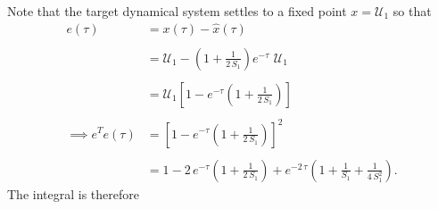 \begin{enumerate}
Note that the target dynamical system settles to a fixed point $x = \mathcal{U}_1$ so that
\begin{align*}
e(\tau) &= x(\tau) -
 \hat
 {
 	x
 }
 (
 	\tau
 )
%
\\
\\
%
&= 
\mathcal{U}_1 - 
\left(
	1 + 
	\frac
	{
		1
	}
	{
		2 \, S_1
	}
\right)
e^
{
	- \tau
}
\, \, \mathcal{U}_1
%
\\
\\
%
&= 
\mathcal{U}_1 
\left[
	1 - e^
	{
		-\tau
	}
	\left(
		1 + 
		\frac
		{
			1
		}
		{
			2 \, S_1
		}
	\right)
\right]
%
\\
\\
%
\implies
e^T e
\left(
\tau
\right)
&=
\left[
	1 - e^
	{
		-\tau
	}
	\left(
		1 + 
		\frac
		{
			1
		}
		{
			2 \, S_1
		}
	\right)
\right]^2
%
\\
\\
%
&= 
1 - 2 \, e^
{
	-\tau
}
\left(
	1 + 
	\frac
	{
		1
	}
	{
		2 \, S_1
	}
\right)
+
e^
{
	-2 \, \tau
}
\left(
	1 + 
	\frac
	{
		1
	}
	{
		S_1
	}
	+
	\frac
	{
		1
	}
	{
		4 \, S_1^2
	}
\right).
\end{align*}
The integral is therefore 


\end{enumerate}
